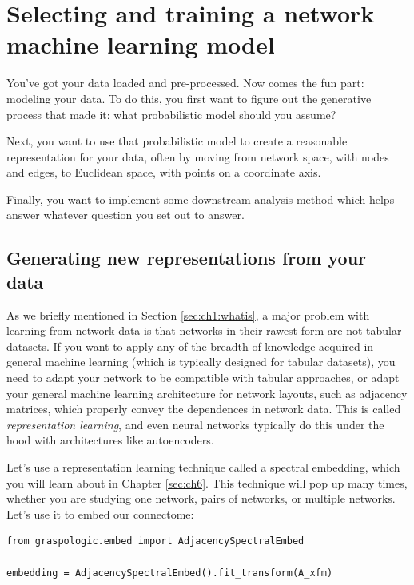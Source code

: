 \section{Selecting and training a network machine learning model}
\label{sec:ch2:select}

You've got your data loaded and pre-processed. Now comes the fun part: modeling your data. To do this, you first want to figure out the generative process that made it: what probabilistic model should you assume?

Next, you want to use that probabilistic model to create a reasonable representation for your data, often by moving from network space, with nodes and edges, to Euclidean space, with points on a coordinate axis.

Finally, you want to implement some downstream analysis method which helps answer whatever question you set out to answer.

\subsection{Generating new representations from your data}

As we briefly mentioned in Section \ref{sec:ch1:whatis}, a major problem with learning from network data is that networks in their rawest form are not tabular datasets. If you want to apply any of the breadth of knowledge acquired in general machine learning (which is typically designed for tabular datasets), you need to adapt your network to be compatible with tabular approaches, or adapt your general machine learning architecture for network layouts, such as adjacency matrices, which properly convey the dependences in network data. This is called \emph{representation learning}, and even neural networks typically do this under the hood with architectures like autoencoders.

Let's use a representation learning technique called a spectral embedding, which you will learn about in Chapter \ref{sec:ch6}. This technique will pop up many times, whether you are studying one network, pairs of networks, or multiple networks. Let's use it to embed our connectome:

\begin{lstlisting}[style=python]
from graspologic.embed import AdjacencySpectralEmbed

embedding = AdjacencySpectralEmbed().fit_transform(A_xfm)
\end{lstlisting}

